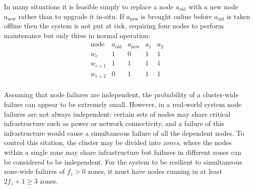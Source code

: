 \documentclass[journal]{IEEEtran}
\begin{document}
In many situations it is feasible simply to replace a node $a_{\textrm{old}}$
with a new node $a_{\textrm{new}}$ rather than to upgrade it in-situ. If
$a_{\textrm{new}}$ is brought online before $a_{\textrm{old}}$ is taken offline
then the system is not put at risk, requiring four nodes to perform maintenance
but only three in normal operation:
\[\begin{array}{rcccc}
\textrm{node}&a_{\textrm{old}}&a_{\textrm{new}}&a_1&a_2 \\
w_e&1&0&1&1\\
w_{e+1}&1&1&1&1\\
w_{e+2}&0&1&1&1\\
\end{array}\]

Assuming that node failures are independent, the probability of a cluster-wide
failure can appear to be extremely small. However, in a real-world system node
failures are not always independent: certain sets of nodes may share critical
infrastructure such as power or network connectivity, and a failure of this
infrastructure would cause a simultaneous failure of all the dependent nodes.
To control this sitation, the cluster may be divided into \textit{zones}, where
the nodes within a single zone may share infrastructure but failures in
different zones can be considered to be independent. For the system to be
resilient to simultaneous zone-wide failures of $f_z > 0$ zones, it must have
nodes running in at least $2f_z + 1 \ge 3$ zones.
\end{document}
